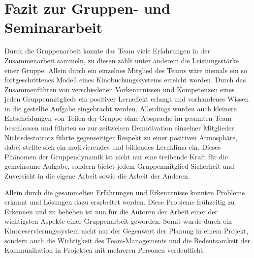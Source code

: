 \section{Fazit zur Gruppen- und Seminararbeit}
\multipleauthorsection{\authorRF}{\authorEJ}

Durch die Gruppenarbeit konnte das Team viele Erfahrungen in der Zusammenarbeit sammeln, zu diesen zählt unter anderem die Leistungsstärke einer Gruppe.
Allein durch ein einzelnes Mitglied des Teams wäre niemals ein so fortgeschrittenes Modell eines Kinobuchungssystems erreicht worden.
Durch das Zusammenführen von verschiedenen Vorkenntnissen und Kompetenzen eines jeden Gruppenmitglieds ein positiver Lerneffekt erlangt und vorhandenes Wissen in die gestellte Aufgabe eingebracht werden.
Allerdings wurden auch kleinere Entscheidungen von Teilen der Gruppe ohne Absprache im gesamten Team beschlossen und führten so zur zeitweisen Demotivation einzelner Mitglieder.
Nichtsdestotrotz führte gegenseitiger Respekt zu einer positiven Atmosphäre, dabei stellte sich ein motivierendes und bildendes Lernklima ein.
Dieses Phänomen der Gruppendynamik ist nicht nur eine treibende Kraft für die gemeinsame Aufgabe, sondern bietet jedem Gruppenmitglied Sicherheit und Zuversicht in die eigene Arbeit sowie die Arbeit der Anderen.

Allein durch die gesammelten Erfahrungen und Erkenntnisse konnten Probleme erkannt und Lösungen dazu erarbeitet werden.
Diese Probleme frühzeitig zu Erkennen und zu beheben ist nun für die Autoren der Arbeit einer der wichtigsten Aspekte einer Gruppenarbeit geworden.
Somit wurde durch ein Kinoreservierungssystem nicht nur der Gegenwert der Planung in einem Projekt, sondern auch die Wichtigkeit des Team-Managements und die Bedeutsamkeit der Kommunikation in Projekten mit mehreren Personen verdeutlicht.
